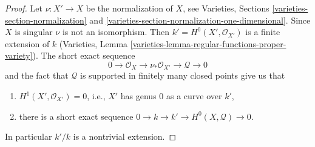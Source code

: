 \begin{proof}
Let $\nu : X' \to X$ be the normalization of $X$, see
Varieties, Sections \ref{varieties-section-normalization} and
\ref{varieties-section-normalization-one-dimensional}.
Since $X$ is singular $\nu$ is not an isomorphism.
Then $k' = H^0(X', \mathcal{O}_{X'})$ is a finite extension of $k$
(Varieties, Lemma \ref{varieties-lemma-regular-functions-proper-variety}).
The short exact sequence
$$
0 \to \mathcal{O}_X \to \nu_*\mathcal{O}_{X'} \to \mathcal{Q} \to 0
$$
and the fact that $\mathcal{Q}$ is supported in finitely many
closed points give us that
\begin{enumerate}
\item $H^1(X', \mathcal{O}_{X'}) = 0$, i.e., $X'$ has genus $0$
as a curve over $k'$,
\item there is a short exact sequence
$0 \to k \to k' \to H^0(X, \mathcal{Q}) \to 0$.
\end{enumerate}
In particular $k'/k$ is a nontrivial extension.


\end{proof}
